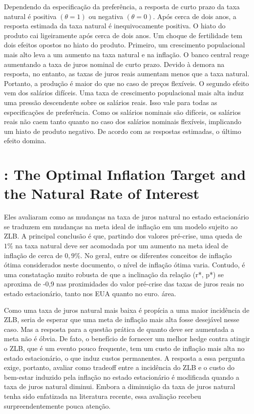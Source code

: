Dependendo da especificação da preferência, a resposta de curto prazo da taxa natural é positiva $(\theta = 1)$ ou negativa $(\theta = 0)$. Após cerca de dois anos, a resposta estimada da taxa natural é inequivocamente positiva. O hiato do produto cai ligeiramente após cerca de dois anos. Um choque de fertilidade tem dois efeitos opostos no hiato do produto. Primeiro, um crescimento populacional mais alto leva a um aumento na taxa natural e na inflação. O banco central reage aumentando a taxa de juros nominal de curto prazo. Devido à demora na resposta, no entanto, as taxas de juros reais aumentam menos que a taxa natural. Portanto, a produção é maior do que no caso de preços flexíveis. O segundo efeito vem dos salários difíceis. Uma taxa de crescimento populacional mais alta induz uma pressão descendente sobre os salários reais. Isso vale para todas as especificações de preferência. Como os salários nominais são difíceis, os salários reais não caem tanto quanto no caso dos salários nominais flexíveis, implicando um hiato de produto negativo. De acordo com as respostas estimadas, o último efeito domina.
%
%
\section{\citet{Gali:2019}: The Optimal Inflation Target and the Natural Rate of Interest }

Eles avaliaram como as mudanças na taxa de juros natural no estado estacionário se traduzem em mudanças na meta ideal de inflação em um modelo sujeito ao ZLB. A principal conclusão é que, partindo dos valores pré-crise, uma queda de $1\%$ na taxa natural deve ser acomodada por um aumento na meta ideal de inflação de cerca de $0,9\%$. No geral, entre os diferentes conceitos de inflação ótima considerados neste documento, o nível de inflação ótima varia. Contudo, é uma constatação muito robusta de que a inclinação da relação (r*, p*) se aproxima de -0,9 nas proximidades do valor pré-crise das taxas de juros reais no estado estacionário, tanto nos EUA quanto no euro. área.

Como uma taxa de juros natural mais baixa é propícia a uma maior incidência de ZLB, seria de esperar que uma meta de inflação mais alta fosse desejável nesse caso. Mas a resposta para a questão prática de quanto deve ser aumentada a meta não é óbvia. De fato, o benefício de fornecer um melhor hedge contra atingir o ZLB, que é um evento pouco frequente, tem um custo de inflação mais alta no estado estacionário, o que induz custos permanentes. A resposta a essa pergunta exige, portanto, avaliar como tradeoff entre a incidência do ZLB e o custo do bem-estar induzido pela inflação no estado estacionário é modificada quando a taxa de juros natural diminui. Embora a diminuição da taxa de juros natural tenha sido enfatizada na literatura recente, essa avaliação recebeu surpreendentemente pouca atenção.

